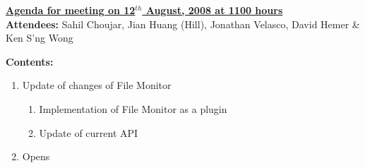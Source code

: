 \documentclass{letter}
\begin{document}
{\large \textbf{\underline{Agenda for meeting on 12$^{th}$ August, 2008 at 1100 hours}}}\\

\textbf{Attendees:} Sahil Choujar, Jian Huang (Hill), Jonathan Velasco, David Hemer \& Ken S'ng Wong

\textbf{Contents:}

\begin{enumerate}
	\item Update of changes of File Monitor
	\begin{enumerate}
	 \item Implementation of File Monitor as a plugin
	 \item Update of current API
 	\end{enumerate}
	\item Opens
\end{enumerate}
\end{document}
